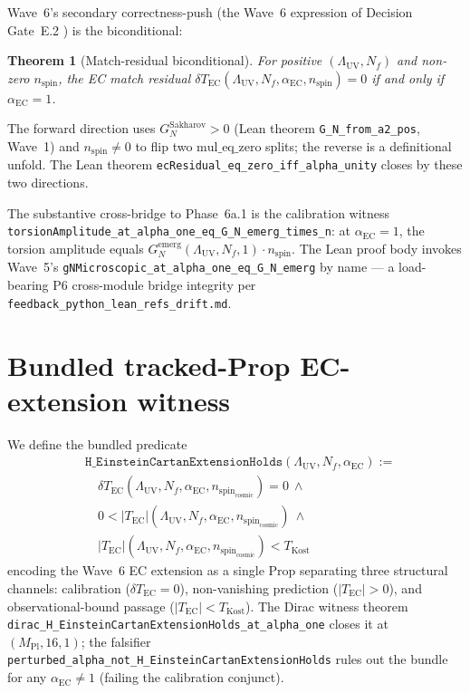\documentclass[twocolumn]{revtex4-2}
\newtheorem{theorem}{Theorem}
\newcommand{\Nf}{N_f}
\newcommand{\LambdaUV}{\Lambda_{\mathrm{UV}}}
\newcommand{\MPl}{M_{\mathrm{Pl}}}
\newcommand{\aEC}{\alpha_{\mathrm{EC}}}
\newcommand{\GNem}{G_{N}^{\mathrm{emerg}}}
\newcommand{\GNsak}{G_{N}^{\mathrm{Sakharov}}}
\newcommand{\TEC}{T_{\mathrm{EC}}}
\newcommand{\nspin}{n_{\mathrm{spin}}}
\newcommand{\TKost}{T_{\mathrm{Kost}}}
\begin{document}
Wave~6's secondary correctness-push (the Wave~6 expression of
Decision Gate~E.2 \cite{Roehm2026Wave1}) is the biconditional:

\begin{theorem}[Match-residual biconditional]
\label{thm:match-bicond}
For positive $(\LambdaUV,\Nf)$ and non-zero $\nspin$, the EC match
residual $\delta\TEC(\LambdaUV,\Nf,\aEC,\nspin) = 0$ if and only if
$\aEC = 1$.
\end{theorem}

The forward direction uses $\GNsak > 0$ (Lean theorem
\texttt{G\_N\_from\_a2\_pos}, Wave~1) and $\nspin \neq 0$ to flip two
$\mathrm{mul\_eq\_zero}$ splits; the reverse is a definitional
unfold. The Lean theorem
\texttt{ecResidual\_eq\_zero\_iff\_alpha\_unity}
closes by these two directions.

The substantive cross-bridge to Phase~6a.1 is the calibration
witness
\texttt{torsionAmplitude\_at\_alpha\_one\_eq\_G\_N\_emerg\_times\_n}:
at $\aEC = 1$, the torsion amplitude equals $\GNem(\LambdaUV,\Nf,1)
\cdot\nspin$. The Lean proof body invokes Wave~5's
\texttt{gNMicroscopic\_at\_alpha\_one\_eq\_G\_N\_emerg}
\cite{Roehm2026Wave5} by name --- a load-bearing P6 cross-module
bridge integrity per
\texttt{feedback\_python\_lean\_refs\_drift.md}.

\section{Bundled tracked-Prop EC-extension witness}

We define the bundled predicate
\begin{align}
&\mathtt{H\_EinsteinCartanExtensionHolds}(\LambdaUV,\Nf,\aEC) :=\nonumber\\
&\quad \delta\TEC(\LambdaUV,\Nf,\aEC,\nspin_{\mathrm{cosmic}}) = 0\ \wedge\nonumber\\
&\quad 0 < |\TEC|(\LambdaUV,\Nf,\aEC,\nspin_{\mathrm{cosmic}})\ \wedge\nonumber\\
&\quad |\TEC|(\LambdaUV,\Nf,\aEC,\nspin_{\mathrm{cosmic}}) < \TKost
\end{align}
encoding the Wave~6 EC extension as a single Prop separating
three structural channels: calibration ($\delta\TEC = 0$),
non-vanishing prediction ($|\TEC| > 0$), and observational-bound
passage ($|\TEC| < \TKost$). The Dirac witness theorem
\texttt{dirac\_H\_EinsteinCartanExtensionHolds\_at\_alpha\_one}
closes it at $(\MPl, 16, 1)$; the falsifier
\texttt{perturbed\_alpha\_not\_H\_EinsteinCartanExtensionHolds}
rules out the bundle for any $\aEC \neq 1$ (failing the calibration
conjunct).
\end{document}

